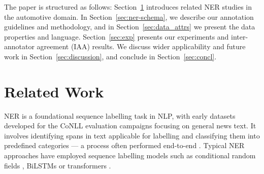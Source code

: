 \documentclass[11pt]{article}
\begin{document}
The paper is structured as follows: Section~\ref{sec:rel-work} introduces related NER studies in the automotive domain. In Section~\ref{sec:ner-schema}, we describe our annotation guidelines and methodology, and in Section~\ref{sec:data_attrs} we present the data properties and language. Section~\ref{sec:exp} presents our experiments and inter-annotator agreement (IAA) results. We discuss wider applicability and future work in Section~\ref{sec:discussion}, and conclude in Section~\ref{sec:concl}.

\section{Related Work}
\label{sec:rel-work}



NER is a foundational sequence labelling task in NLP, with early datasets developed for the CoNLL evaluation campaigns \cite{tjong-kim-sang-de-meulder-2003-introduction} focusing on general news text. It involves identifying spans in text applicable for labelling and classifying them into predefined categories --- a process often performed end-to-end \citep{JEHANGIR2023100017}. Typical NER approaches have employed sequence labelling models such as conditional random fields \citep{keraghel2024recentadvancesnamedentity}, BiLSTMs \cite{chiu-nichols-2016-named} or transformers \cite{hanh-2021-named}.

\end{document}
